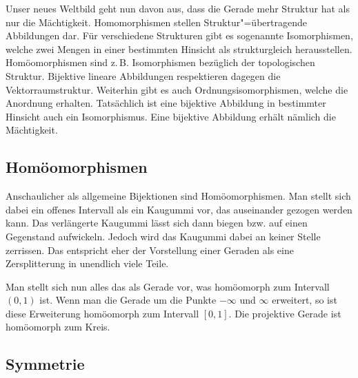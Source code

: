 \documentclass[a4paper,10pt,fleqn,twocolumn,twoside,dvipdfmx]{scrartcl}
\begin{document}
Unser neues Weltbild geht nun davon aus, dass die Gerade mehr
Struktur hat als nur die Mächtigkeit. Homomorphismen stellen
Struktur"=übertragende Abbildungen dar. Für verschiedene Strukturen
gibt es sogenannte Isomorphismen, welche zwei Mengen in einer
bestimmten Hinsicht als strukturgleich herausstellen. Homöomorphismen
sind z.\,B. Isomorphismen bezüglich der topologischen Struktur.
Bijektive lineare Abbildungen respektieren dagegen die
Vektorraumstruktur. Weiterhin gibt es auch Ordnungsisomorphismen,
welche die Anordnung erhalten. Tatsächlich ist eine bijektive
Abbildung in bestimmter Hinsicht auch ein Isomorphismus.
Eine bijektive Abbildung erhält nämlich die Mächtigkeit.


\subsection{Homöomorphismen}

Anschaulicher als allgemeine Bijektionen sind Homöomorphismen. Man
stellt sich dabei ein offenes Intervall als ein Kaugummi vor, das
auseinander gezogen werden kann. Das verlängerte Kaugummi lässt sich
dann biegen bzw. auf einen Gegenstand aufwickeln. Jedoch wird das
Kaugummi dabei an keiner Stelle zerrissen. Das entspricht eher der
Vorstellung einer Geraden als eine Zersplitterung in unendlich
viele Teile.

Man stellt sich nun alles das als Gerade vor, was homöomorph zum
Intervall $(0,1)$ ist. Wenn man die Gerade um die Punkte
$-\infty$ und $\infty$ erweitert, so ist diese Erweiterung
homöomorph zum Intervall $[0,1]$. Die projektive Gerade ist
homöomorph zum Kreis.

\subsection{Symmetrie}
\end{document}
